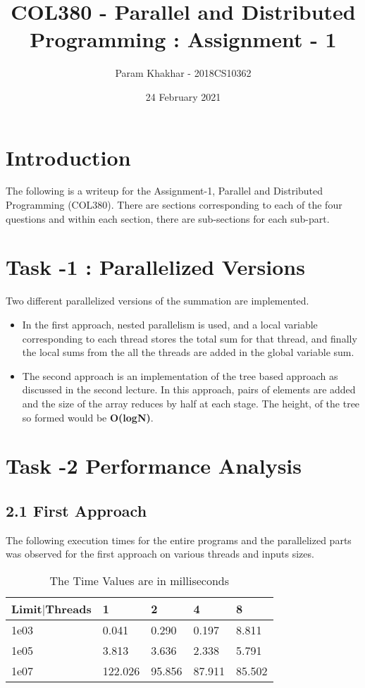 \documentclass[12pt]{article}
\title{COL380 - Parallel and Distributed Programming : Assignment - 1}
\author{Param Khakhar - 2018CS10362}
\date{24 February 2021}
\begin{document}
\maketitle

\section *{Introduction}

The following is a writeup for the Assignment-1, Parallel and Distributed Programming (COL380). There are sections corresponding to each of the four questions and within each section, there are sub-sections for each sub-part.

\section*{Task -1 : Parallelized Versions}

  Two different parallelized versions of the summation are implemented. 
  \begin{itemize}
    \item In the first approach, nested parallelism is used, and a local variable corresponding to each thread stores the total sum for that thread, and finally the local sums from the all the threads are added in the global variable sum.
    \item The second approach is an implementation of the tree based approach as discussed in the second lecture. In this approach, pairs of elements are added and the size of the array reduces by half at each stage. The height, of the tree so formed would be \textbf{O(logN)}.
  \end{itemize}

\section*{Task -2 Performance Analysis}

  \subsection*{2.1 First Approach}

  The following execution times for the entire programs and the parallelized parts was observed for the first approach on various threads and inputs sizes.
  \begin{table}[H]
    \begin{tabular}{lllll} \toprule
        \textbf{Limit$|$Threads}& \textbf{1} & \textbf{2} & \textbf{4} & \textbf{8}\\\midrule
        1e03 & 0.041 & 0.290 & 0.197 & 8.811\\
        1e05 & 3.813 & 3.636 & 2.338 & 5.791\\
        1e07 & 122.026 & 95.856 & 87.911 & 85.502\\
        \bottomrule
      \end{tabular}
    \caption{The Time Values are in milliseconds}\label{Tab1}
  \end{table} 
\end{document}
